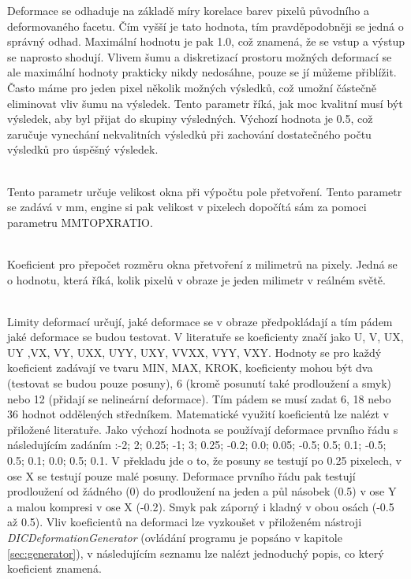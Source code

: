 \documentclass[a4paper,12pt]{article}
\begin{document}
\begin{description}
Deformace se odhaduje na základě míry korelace barev pixelů původního a deformovaného facetu. Čím vyšší je tato hodnota, tím pravděpodobněji se jedná o správný odhad. Maximální hodnotu je pak 1.0, což znamená, že se vstup a výstup se naprosto shodují. Vlivem šumu a diskretizací prostoru možných deformací se ale maximální hodnoty prakticky nikdy nedosáhne, pouze se jí můžeme přiblížit. Často máme pro jeden pixel několik možných výsledků, což umožní částečně eliminovat vliv šumu na výsledek. Tento parametr říká, jak moc kvalitní musí být výsledek, aby byl přijat do skupiny výsledných. Výchozí hodnota je 0.5, což zaručuje vynechání nekvalitních výsledků při zachování dostatečného počtu výsledků pro úspěšný výsledek. 
\item[STRAIN\textunderscore ESTIMATION\textunderscore PARAM] [double]\\
Tento parametr určuje velikost okna při výpočtu pole přetvoření. Tento parametr se zadává v mm, engine si pak velikost v pixelech dopočítá sám za pomoci parametru MM\textunderscore TO\textunderscore PX\textunderscore RATIO.
\item[MM\textunderscore TO\textunderscore PX\textunderscore RATIO] [double]\\
Koeficient pro přepočet rozměru okna přetvoření z milimetrů na pixely. Jedná se o hodnotu, která říká, kolik pixelů v obraze je jeden milimetr v reálném světě.
\item[DEFORMATION\textunderscore LIMITS] [double ; double ; double...]\\
Limity deformací určují, jaké deformace se v obraze předpokládají a tím pádem jaké deformace se budou testovat. V literatuře se koeficienty značí jako U, V, UX, UY ,VX, VY, UXX, UYY, UXY, VVXX, VYY, VXY.  Hodnoty se pro každý koeficient zadávají ve tvaru MIN, MAX, KROK, koeficienty mohou být dva (testovat se budou pouze posuny), 6 (kromě posunutí také prodloužení a smyk) nebo 12 (přidají se nelineární deformace). Tím pádem se musí zadat 6, 18 nebo 36 hodnot oddělených středníkem. Matematické využití koeficientů lze nalézt v přiložené literatuře. Jako výchozí hodnota se používají deformace prvního řádu s následujícím zadáním :-2; 2; 0.25; -1; 3; 0.25; -0.2; 0.0; 0.05; -0.5; 0.5; 0.1; -0.5; 0.5; 0.1; 0.0; 0.5; 0.1. V překladu jde o to, že posuny se testují po 0.25 pixelech, v ose X se testují pouze malé posuny. Deformace prvního řádu pak testují prodloužení od žádného (0) do prodloužení na jeden a půl násobek (0.5) v ose Y a malou kompresi v ose X (-0.2). Smyk pak záporný i kladný v obou osách (-0.5 až 0.5). Vliv koeficientů na deformaci lze vyzkoušet v přiloženém nástroji \emph{DIC\textunderscore DeformationGenerator} (ovládání programu je popsáno v kapitole \ref{sec:generator}), v následujícím seznamu lze nalézt jednoduchý popis, co který koeficient znamená.

\end{description}
\end{document}
